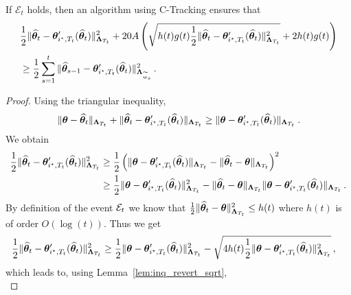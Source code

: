 \begin{lemma}\label{lem:nc_proof_to_online_formulation}
If $\mathcal E_t$ holds, then an algorithm using C-Tracking ensures that
\begin{align*}
    &\frac{1}{2}\Vert \widehat{{\boldsymbol \theta}}_t - {\boldsymbol \theta}'_{i^\star,T_t}(\widehat{{\boldsymbol \theta}}_t) \Vert_{{\boldsymbol \Lambda}_{T_t}}^2 + 20 A\left(\sqrt{h(t)g(t) \frac{1}{2}\Vert \widehat{{\boldsymbol \theta}}_t - {\boldsymbol \theta}'_{i^\star,T_t}(\widehat{{\boldsymbol \theta}}_t) \Vert_{{\boldsymbol \Lambda}_{T_t}}^2}+ 2h(t)g(t)\right)\\
    &\geq \frac{1}{2}\sum_{s=1}^t \Vert \widehat{{\boldsymbol \theta}}_{s-1} - {\boldsymbol \theta}'_{i^\star,T_t}(\widehat{{\boldsymbol \theta}}_t)\Vert_{{\boldsymbol \Lambda}_{\widetilde{w}_s}}^2\,.
\end{align*}
\end{lemma}
\begin{proof}

Using the triangular inequality,
\begin{align*}
\Vert {\boldsymbol \theta} - \widehat{{\boldsymbol \theta}}_t \Vert_{{\boldsymbol \Lambda}_{T_t}} + \Vert \widehat{{\boldsymbol \theta}}_t - {\boldsymbol \theta}'_{i^\star,T_t}(\widehat{{\boldsymbol \theta}}_t) \Vert_{{\boldsymbol \Lambda}_{T_t}}
\ge \Vert {\boldsymbol \theta} - {\boldsymbol \theta}'_{i^\star,T_t}(\widehat{{\boldsymbol \theta}}_t) \Vert_{{\boldsymbol \Lambda}_{T_t}}
\: .
\end{align*}
We obtain
\begin{align*}
\frac{1}{2}\Vert \widehat{{\boldsymbol \theta}}_t - {\boldsymbol \theta}'_{i^\star,T_t}(\widehat{{\boldsymbol \theta}}_t) \Vert_{{\boldsymbol \Lambda}_{T_t}}^2
&\ge \frac{1}{2} \left(\Vert {\boldsymbol \theta} - {\boldsymbol \theta}'_{i^\star,T_t}(\widehat{{\boldsymbol \theta}}_t) \Vert_{{\boldsymbol \Lambda}_{T_t}} -\Vert \widehat{{\boldsymbol \theta}}_t -{\boldsymbol \theta} \Vert_{{\boldsymbol \Lambda}_{T_t}} \right)^2
\\
&\ge \frac{1}{2}\Vert {\boldsymbol \theta} - {\boldsymbol \theta}'_{i^\star,T_t}(\widehat{{\boldsymbol \theta}}_t) \Vert_{{\boldsymbol \Lambda}_{T_t}}^2
	-  \Vert \widehat{{\boldsymbol \theta}}_t -{\boldsymbol \theta} \Vert_{{\boldsymbol \Lambda}_{T_t}} \Vert {\boldsymbol \theta} - {\boldsymbol \theta}'_{i^\star,T_t}(\widehat{{\boldsymbol \theta}}_t) \Vert_{{\boldsymbol \Lambda}_{T_t}}
\,.
\end{align*}
By definition of the event $\mathcal{E}_t$ we know that $\frac{1}{2}\Vert \widehat{{\boldsymbol \theta}}_t -{\boldsymbol \theta} \Vert_{{\boldsymbol \Lambda}_{T_t}}^2 \leq h(t)$ where $h(t)$ is of order $O(\log(t))$. Thus we get
\begin{align*}
\frac{1}{2}\Vert \widehat{{\boldsymbol \theta}}_t - {\boldsymbol \theta}'_{i^\star,T_t}(\widehat{{\boldsymbol \theta}}_t) \Vert_{{\boldsymbol \Lambda}_{T_t}}^2 &\ge \frac{1}{2} \Vert {\boldsymbol \theta} - {\boldsymbol \theta}'_{i^\star,T_t}(\widehat{{\boldsymbol \theta}}_t) \Vert_{{\boldsymbol \Lambda}_{T_t}}^2 - \sqrt{4 h(t) \frac{1}{2}\Vert {\boldsymbol \theta} - {\boldsymbol \theta}'_{i^\star,T_t}(\widehat{{\boldsymbol \theta}}_t) \Vert_{{\boldsymbol \Lambda}_{T_t}}^2}\,,
\end{align*}
which leads to, using Lemma~\ref{lem:inq_revert_sqrt},
\begin{equation}

\end{equation}
\end{proof}
